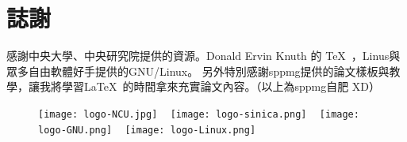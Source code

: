 \documentclass[class=NCU_thesis, crop=false, float=true]{standalone}
\begin{document}


\chapter{誌謝}

感謝中央大學、中央研究院提供的資源。Donald Ervin Knuth 的 \TeX\ ，Linus與眾多自由軟體好手提供的GNU/Linux。
另外特別感謝sppmg提供的論文樣板與教學，讓我將學習\LaTeX\ 的時間拿來充實論文內容。（以上為sppmg自肥 XD）

\begin{figure}[!hbt]
    \captionsetup[subfigure]{labelformat=empty}
    \centering
    \subcaptionbox
        {}
        {\texttt{[image: logo-NCU.jpg]}}
    ~
    \subcaptionbox
        {}
        {\texttt{[image: logo-sinica.png]}}
    ~
    \subcaptionbox
        {}
        {\texttt{[image: logo-GNU.png]}}
    ~
    \subcaptionbox
        {}
        {\texttt{[image: logo-Linux.png]}}
\end{figure}
\end{document}
